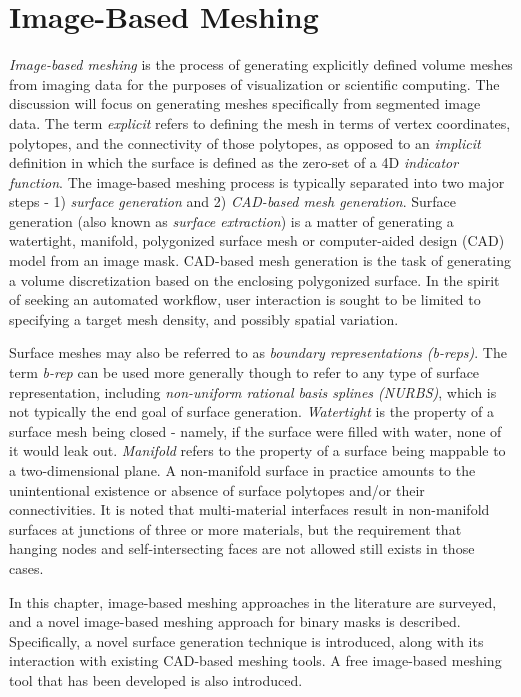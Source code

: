 \chapter{Image-Based Meshing}
\label{chap:3}

\textit{Image-based meshing} is the process of generating explicitly defined volume meshes from imaging data for the purposes of visualization or scientific computing. The discussion will focus on generating meshes specifically from segmented image data. The term \textit{explicit} refers to defining the mesh in terms of vertex coordinates, polytopes, and the connectivity of those polytopes, as opposed to an \textit{implicit} definition in which the surface is defined as the zero-set of a 4D \textit{indicator function}. The image-based meshing process is typically separated into two major steps - 1) \textit{surface generation} and 2) \textit{CAD-based mesh generation}. Surface generation (also known as \textit{surface extraction}) is a matter of generating a watertight, manifold, polygonized surface mesh or computer-aided design (CAD) model from an image mask. CAD-based mesh generation is the task of generating a volume discretization based on the enclosing polygonized surface. In the spirit of seeking an automated workflow, user interaction is sought to be limited to specifying a target mesh density, and possibly spatial variation.

Surface meshes may also be referred to as \textit{boundary representations (b-reps)}. The term \textit{b-rep} can be used more generally though to refer to any type of surface representation, including \textit{non-uniform rational basis splines (NURBS)}, which is not typically the end goal of surface generation. \textit{Watertight} is the property of a surface mesh being closed - namely, if the surface were filled with water, none of it would leak out. \textit{Manifold} refers to the property of a surface being mappable to a two-dimensional plane. A non-manifold surface in practice amounts to the unintentional existence or absence of surface polytopes and/or their connectivities. It is noted that multi-material interfaces result in non-manifold surfaces at junctions of three or more materials, but the requirement that hanging nodes and self-intersecting faces are not allowed still exists in those cases.

In this chapter, image-based meshing approaches in the literature are surveyed, and a novel image-based meshing approach for binary masks is described. Specifically, a novel surface generation technique is introduced, along with its interaction with existing CAD-based meshing tools. A free image-based meshing tool that has been developed is also introduced.

